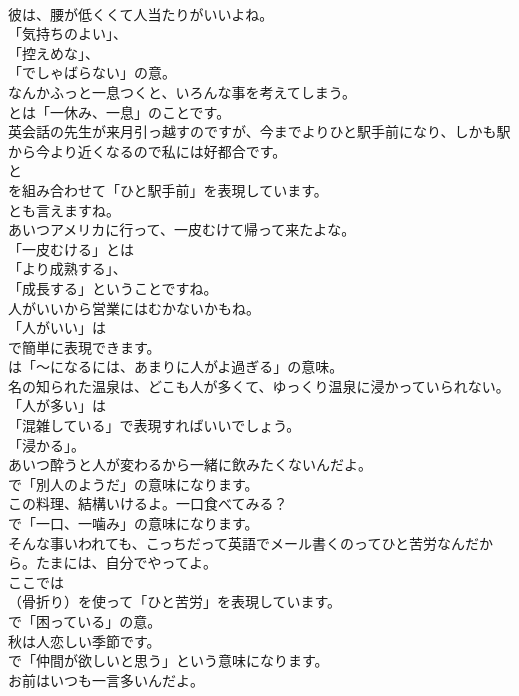 \documentclass[8pt]{extreport}
\begin{document}
\begin{CJK}{UTF8}{min}
\\	彼は、腰が低くくて人当たりがいいよね。 
\\	「気持ちのよい」、
\\	「控えめな」、
\\	「でしゃばらない」の意。	
\\	なんかふっと一息つくと、いろんな事を考えてしまう。 
\\	とは「一休み、一息」のことです。	
\\	英会話の先生が来月引っ越すのですが、今までよりひと駅手前になり、しかも駅から今より近くなるので私には好都合です。 
\\	と 
\\	を組み合わせて「ひと駅手前」を表現しています。
\\	とも言えますね。	
\\	あいつアメリカに行って、一皮むけて帰って来たよな。 
\\	「一皮むける」とは
\\	「より成熟する」、
\\	「成長する」ということですね。	
\\	人がいいから営業にはむかないかもね。 
\\	「人がいい」は
\\	で簡単に表現できます。
\\	は「～になるには、あまりに人がよ過ぎる」の意味。	
\\	名の知られた温泉は、どこも人が多くて、ゆっくり温泉に浸かっていられない。 
\\	「人が多い」は
\\	「混雑している」で表現すればいいでしょう。
\\	「浸かる」。	
\\	あいつ酔うと人が変わるから一緒に飲みたくないんだよ。 
\\	で「別人のようだ」の意味になります。	
\\	この料理、結構いけるよ。一口食べてみる？ 
\\	で「一口、一噛み」の意味になります。	
\\	そんな事いわれても、こっちだって英語でメール書くのってひと苦労なんだから。たまには、自分でやってよ。 
\\	ここでは
\\	（骨折り）を使って「ひと苦労」を表現しています。
\\	で「困っている」の意。	
\\	秋は人恋しい季節です。 
\\	で「仲間が欲しいと思う」という意味になります。	
\\	お前はいつも一言多いんだよ。 

\end{CJK}
\end{document}
